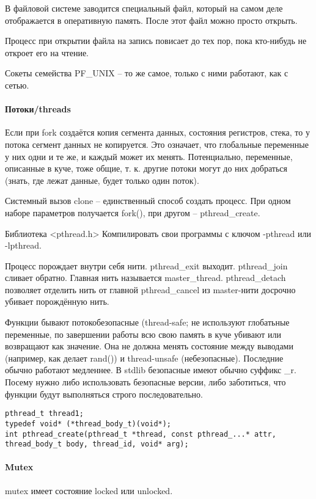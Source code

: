 \documentclass[a4paper,10pt]{article}
\begin{document}
В файловой системе заводится специальный файл, который на самом деле отображается в оперативную память. После этот файл можно просто открыть.

Процесс при открытии файла на запись повисает до тех пор, пока кто-нибудь не откроет его на чтение.

Сокеты семейства PF\_UNIX -- то же самое, только с ними работают, как с сетью.

\paragraph{Потоки/threads}
Если при fork создаётся копия сегмента данных, состояния регистров, стека, то у потока сегмент данных не копируется. Это означает, что глобальные переменные у них одни и те же, и каждый может их менять. Потенциально, переменные, описанные в куче, тоже общие, т. к. другие потоки могут до них добраться (знать, где лежат данные, будет только один поток).

Системный вызов clone -- единственный способ создать процесс. При одном наборе параметров получается fork(), при другом -- pthread\_create.

Библиотека <pthread.h>
Компилировать свои программы с ключом -pthread или -lpthread.

Процесс порождает внутри себя нити. pthread\_exit выходит. pthread\_join сливает обратно. 
Главная нить называется master\_thread. pthread\_detach позволяет отделить нить от главной 
pthread\_cancel из master-нити досрочно убивает порождённую нить.

Функции бывают потокобезопасные (thread-safe; не используют глобатьные переменные, по завершении работы всю свою память в куче убивают или возвращают как значение. Она не должна менять состояние между выводами (например, как делает rand()) и thread-unsafe (небезопасные). Последние обычно работают медленнее. В stdlib безопасные имеют обычно суффикс \_r.
Посему нужно либо использовать безопасные версии, либо заботиться, что функции будут выполняться строго последовательно.
\begin{verbatim}
pthread_t thread1;
typedef void* (*thread_body_t)(void*);
int pthread_create(pthread_t *thread, const pthread_...* attr, thread_body_t body, thread_id, void* arg);
\end{verbatim}

\paragraph{Mutex}
mutex имеет состояние locked или unlocked.
\end{document}
